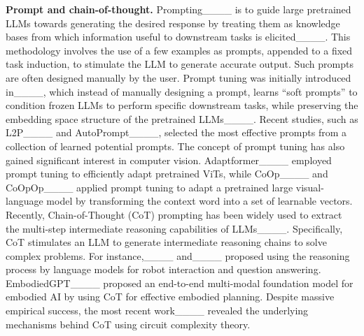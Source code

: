 \noindent \textbf{Prompt and chain-of-thought.}
Prompting____ is to guide large pretrained LLMs towards generating the desired response by treating them as knowledge bases from which information useful to downstream tasks is elicited____. This methodology involves the use of a few examples as prompts, appended to a fixed task induction, to stimulate the LLM to generate accurate output. Such prompts are often designed manually by the user. Prompt tuning was initially introduced in____, which instead of manually designing a prompt, learns ``soft prompts'' to condition frozen LLMs to perform specific downstream tasks, while preserving the embedding space structure of the pretrained LLMs____. Recent studies, such as L2P____ and AutoPrompt____, selected the most effective prompts from a collection of learned potential prompts. The concept of prompt tuning has also gained significant interest in computer vision. Adaptformer____ employed prompt tuning to efficiently adapt pretrained ViTs, while CoOp____ and CoOpOp____ applied prompt tuning to adapt a pretrained large visual-language model by transforming the context word into a set of learnable vectors. Recently, Chain-of-Thought (CoT) prompting has been widely used to extract the multi-step intermediate reasoning capabilities of LLMs____. Specifically, CoT stimulates an LLM to generate intermediate reasoning chains to solve complex problems. For instance,____ and____ proposed using the reasoning process by language models for robot interaction and question answering. EmbodiedGPT____ proposed an end-to-end multi-modal foundation model for embodied AI by using CoT for effective embodied planning. Despite massive empirical success, the most recent work____ revealed the underlying mechanisms behind CoT using circuit complexity theory.

